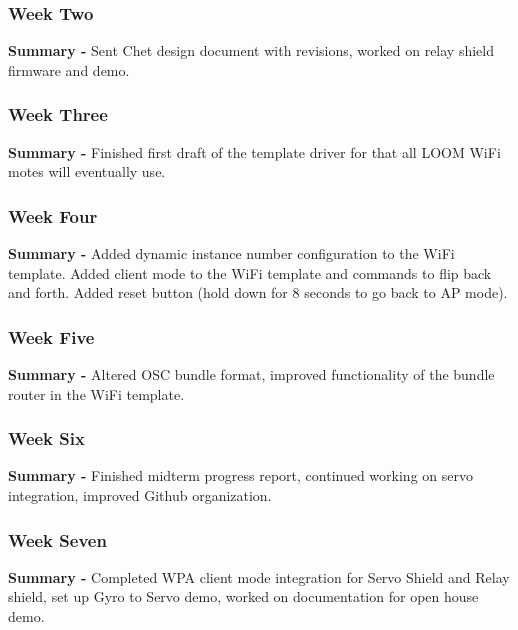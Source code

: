 \documentclass[onecolumn, draftclsnofoot,10pt, compsoc]{IEEEtran}
\begin{document}
\subsubsection*{Week Two}
    \begin{adjustwidth}{2.5em}{0pt}
    \textbf{Summary -} 	Sent Chet design document with revisions, worked on relay shield firmware and demo.
    \end{adjustwidth}

\subsubsection*{Week Three}
    \begin{adjustwidth}{2.5em}{0pt}
    \textbf{Summary -} Finished first draft of the template driver for that all LOOM WiFi motes will eventually use.
    \end{adjustwidth}

\subsubsection*{Week Four}
    \begin{adjustwidth}{2.5em}{0pt}
    \textbf{Summary -} Added dynamic instance number configuration to the WiFi template. Added client mode to the WiFi template and commands to flip back and forth. Added reset button (hold down for 8 seconds to go back to AP mode).

    \end{adjustwidth}

\subsubsection*{Week Five}
    \begin{adjustwidth}{2.5em}{0pt}
    \textbf{Summary -} Altered OSC bundle format, improved functionality of the bundle router in the WiFi template.
    \end{adjustwidth}

\subsubsection*{Week Six}
    \begin{adjustwidth}{2.5em}{0pt}
    \textbf{Summary -} Finished midterm progress report, continued working on servo integration, improved Github organization.
    \end{adjustwidth}

\subsubsection*{Week Seven}
    \begin{adjustwidth}{2.5em}{0pt}
    \textbf{Summary -} Completed WPA client mode integration for Servo Shield and Relay shield, set up Gyro to Servo demo, worked on documentation for open house demo.
    \end{adjustwidth}
\end{document}
